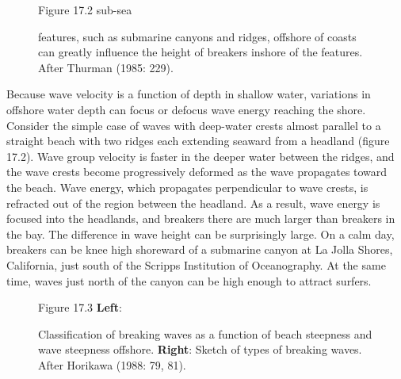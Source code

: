 \begin{figure}[b!]
\vspace{-1ex}
\centering
{}
\footnotesize
Figure 17.2 sub-sea \rule{0mm}{4ex}features, such as submarine canyons
and ridges, offshore of coasts can greatly influence the height of
breakers inshore of the features. After
Thurman (1985: 229).

\label{wavefocusing}
\end{figure}

Because wave velocity is a function of depth in shallow water,
variations in offshore water depth can focus or defocus wave energy
reaching the shore. Consider the simple case of waves with deep-water
crests almost parallel to a straight beach with two ridges each
extending seaward from a headland (figure 17.2). Wave group velocity
is faster in the deeper water between the ridges, and the wave crests
become progressively deformed as the wave propagates toward the
beach. Wave energy, which propagates perpendicular to wave crests, is
refracted out of the region between the headland. As a result, wave
energy is focused into the headlands, and
breakers there are much larger than breakers
in the bay. The difference in wave height can be surprisingly
large. On a calm day, breakers can be knee high shoreward of a
submarine canyon at La Jolla Shores, California, just south of the
Scripps Institution of Oceanography. At the same time, waves just
north of the canyon can be high enough to attract surfers.

\begin{figure}[t!]
\centering
{}
\footnotesize
Figure 17.3 \textbf{Left}:
\rule{0mm}{3ex}Classification of breaking
waves as a function of beach steepness and wave steepness
offshore. \textbf{Right}: Sketch of types of breaking waves. After
Horikawa (1988: 79, 81).

\label{fig:breakers}
\vspace{-3ex}
\end{figure}

